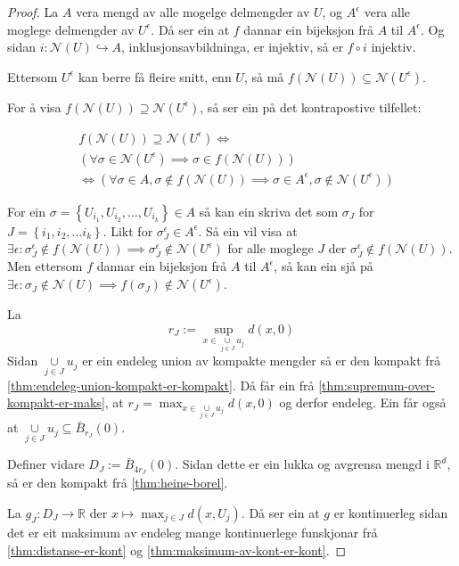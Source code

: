 \documentclass[a4paper, 12pt, norsk]{article}
\theoremstyle{plain}
\theoremstyle{definition}
\newcommand{\Rb}{\mathbb{R}}
\newcommand{\Nc}{\mathcal{N}}
\newcommand{\union}{ \mathop{\cup}\limits }
\newcommand{\set}[1]{ \left\{ #1 \right\} } %
\newcommand{\tuple}[1]{ \left( #1 \right) } %
\begin{document}
\begin{proof}
	La \( A \) vera mengd av alle mogelge delmengder av \( U \), og \( A^\epsilon \) vera alle moglege delmengder av \( U^\epsilon \). Då ser ein at \( f \) dannar ein bijeksjon frå \( A \) til \( A^\epsilon \). Og sidan \( i: \Nc(U) \hookrightarrow A \), inklusjonsavbildninga, er injektiv, så er \( f \circ i \) injektiv.

	Ettersom \( U^{\epsilon} \) kan berre få fleire snitt, enn \( U \), så må \( f(\Nc(U)) \subseteq \Nc(U^{\epsilon}) \).
	
	For å visa \( f(\Nc(U)) \supseteq \Nc(U^{\epsilon}) \), så ser ein på det kontrapostive tilfellet:
	 
	\begin{align*}
		&f(\Nc(U)) \supseteq \Nc(U^{\epsilon}) \iff \\ 
		&\tuple{\forall \sigma \in \Nc(U^{\epsilon}) \implies \sigma \in f(\Nc(U))} \\
		&\iff \tuple{\forall \sigma \in A, \sigma \not\in f(\Nc(U)) \implies \sigma \in A^\epsilon, \sigma \not\in \Nc(U^{\epsilon})}
	\end{align*}

	For ein \( \sigma = \set{U_{i_1}, U_{i_2}, \dots, U_{i_k}} \in A \) så kan ein skriva det som \( \sigma_J \) for \( J = \set{i_1, i_2, \dots i_k} \). Likt for \( \sigma^\epsilon_J \in A^\epsilon \). Så ein vil visa at \( \exists \epsilon : \sigma^\epsilon_J \not\in f(\Nc(U)) \implies \sigma^\epsilon_J \not\in \Nc(U^{\epsilon}) \) for alle moglege \( J \) der \( \sigma^\epsilon_J \not\in f(\Nc(U)) \). Men ettersom \( f \) dannar ein bijeksjon frå \( A \) til \( A^\epsilon \), så kan ein sjå på \( \exists \epsilon : \sigma_J \not\in \Nc(U) \implies f(\sigma_J) \not\in \Nc(U^{\epsilon}) \).

	La
	\[
		r_J := \sup_{x \in \union_{j \in J} u_j} d(x,0)
	\]
	Sidan \( \union_{j \in J} u_j \) er ein endeleg union av kompakte mengder så er den kompakt frå \autoref{thm:endeleg-union-kompakt-er-kompakt}. Då får ein frå \autoref{thm:supremum-over-kompakt-er-maks}, at \( r_J = \max_{x \in \union_{j \in J} u_j} d(x,0) \) og derfor endeleg. Ein får også at \( \union_{j \in J} u_j \subseteq \bar{B}_{r_J}(0) \).
	
	Definer vidare \( D_J := \bar{B}_{4r_J}(0) \). Sidan dette er ein lukka og avgrensa mengd i \( \Rb^d \), så er den kompakt frå \autoref{thm:heine-borel}.

	La \( g_J: D_J \to \Rb \) der \( x \mapsto \max_{j \in J} d(x, U_j) \). Då ser ein at \( g \) er kontinuerleg sidan det er eit maksimum av endeleg mange kontinuerlege funskjonar frå \autoref{thm:distanse-er-kont} og \autoref{thm:maksimum-av-kont-er-kont}.


\end{proof}
\end{document}
